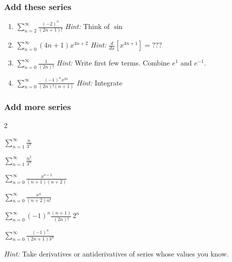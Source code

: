 \documentclass[14pt]{beamer}
\begin{document}
\begin{frame}[t]
	\fontsize{13}{13}\selectfont
	\frametitle{Add these series}

	\begin{enumerate}
		\item $\displaystyle \sum_{n=2}^{\infty}\frac{(-2)^{n}}{(2n+1)!}$ \hfill \emph{Hint:}
			Think of $\sin$

			\vfill

		\item $\displaystyle \sum_{n=0}^{\infty}(4n+1){x^{4n+2}}$ \hfill \emph{Hint:}
			$\displaystyle \frac{d}{dx}\left[ x^{4n+1}\right] = ???$

			\vfill

		\item $\displaystyle \sum_{n=0}^{\infty}\frac{1}{(2n)!}$ \hfill \emph{Hint:}
			Write first few terms. Combine $\displaystyle e^{1}$ and $\displaystyle e^{-1}$.

			\vfill

		\item $\displaystyle \sum_{n=0}^{\infty}\frac{(-1)^{n}x^{2n}}{(2n)!(n+1)}$ \hfill
			\emph{Hint:} Integrate %

			\vfill
	\end{enumerate}
\end{frame}

\begin{frame}[t]
	\frametitle{Add more series}
	\vspace{-.5cm}

	\begin{enumerate}
		\addtocounter{enumi}{4}
	\end{enumerate}
	\vspace{.5cm}

	\emph{Hint:} Take derivatives or antiderivatives of series whose values you
	know.
\end{frame}
\end{document}
